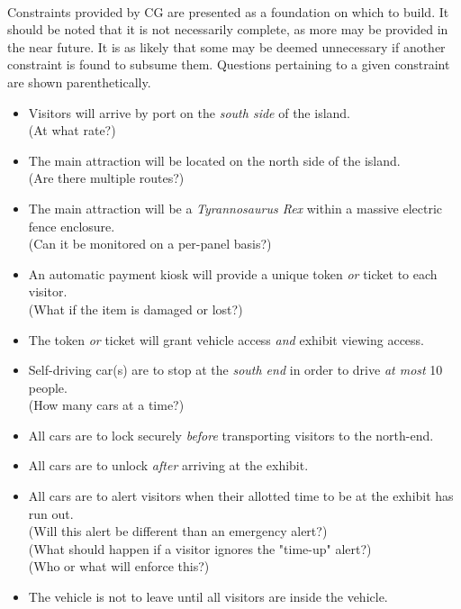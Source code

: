 \documentclass[12pt]{article}
\begin{document}
    \paragraph{} Constraints provided by CG are presented as a foundation on which to build. It should be 
    noted that it is not necessarily complete, as more may be provided in the near future. It is as likely 
    that some may be deemed unnecessary if another constraint is found to subsume them. Questions pertaining 
    to a given constraint are shown parenthetically.
    \begin{itemize}
        \item Visitors will arrive by port on the \textit{south side} of the island.
        \\(At what rate?)
        \item The main attraction will be located on the north side of the island. 
        \\(Are there multiple routes?)
        \item The main attraction will be a \textit{Tyrannosaurus Rex} within a massive electric fence enclosure. 
        \\(Can it be monitored on a per-panel basis?)
        \item An automatic payment kiosk will provide a unique token \textit{or} ticket to each visitor. 
        \\(What if the item is damaged or lost?)
        \item The token \textit{or} ticket will grant vehicle access \textit{and} exhibit viewing access.
        \item Self-driving car(s) are to stop at the \textit{south end} in order to drive \textit{at most} 10 people. 
        \\(How many cars at a time?)
        \item All cars are to lock securely \textit{before} transporting visitors to the north-end.
        \item All cars are to unlock \textit{after} arriving at the exhibit.
        \item All cars are to alert visitors when their allotted time to be at the exhibit has run out. 
        \\(Will this alert be different than an emergency alert?)
        \\(What should happen if a visitor ignores the "time-up" alert?)
        \\(Who or what will enforce this?)
        \item The vehicle is not to leave until all visitors are inside the vehicle. 

\end{itemize}
\end{document}
